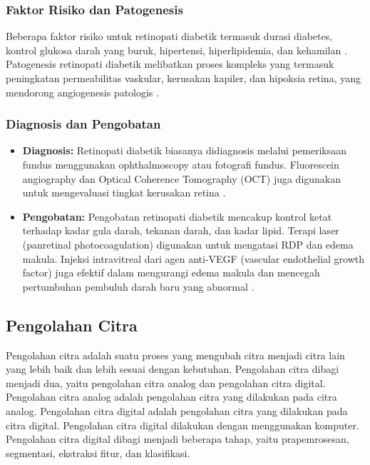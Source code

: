 \subsubsection{Faktor Risiko dan Patogenesis}

Beberapa faktor risiko untuk retinopati diabetik termasuk durasi diabetes, kontrol glukosa darah yang buruk, hipertensi, hiperlipidemia, dan kehamilan \parencite{fong2004diabetic}. Patogenesis retinopati diabetik melibatkan proses kompleks yang termasuk peningkatan permeabilitas vaskular, kerusakan kapiler, dan hipoksia retina, yang mendorong angiogenesis patologis \parencite{antonetti2012diabetic}.

\subsubsection{Diagnosis dan Pengobatan}

\begin{itemize}
    \item \textbf{Diagnosis:} Retinopati diabetik biasanya didiagnosis melalui pemeriksaan fundus menggunakan ophthalmoscopy atau fotografi fundus. Fluorescein angiography dan Optical Coherence Tomography (OCT) juga digunakan untuk mengevaluasi tingkat kerusakan retina \parencite{browning2008optical}.
    \item \textbf{Pengobatan:} Pengobatan retinopati diabetik mencakup kontrol ketat terhadap kadar gula darah, tekanan darah, dan kadar lipid. Terapi laser (panretinal photocoagulation) digunakan untuk mengatasi RDP dan edema makula. Injeksi intravitreal dari agen anti-VEGF (vascular endothelial growth factor) juga efektif dalam mengurangi edema makula dan mencegah pertumbuhan pembuluh darah baru yang abnormal \parencite{ciulla2003intravitreal}.
\end{itemize}

\subsection{Pengolahan Citra}
\label{sec:221}

Pengolahan citra adalah suatu proses yang mengubah citra menjadi citra lain yang lebih baik dan lebih sesuai dengan kebutuhan. Pengolahan citra dibagi menjadi dua, yaitu pengolahan citra analog dan pengolahan citra digital. Pengolahan citra analog adalah pengolahan citra yang dilakukan pada citra analog. Pengolahan citra digital adalah pengolahan citra yang dilakukan pada citra digital. Pengolahan citra digital dilakukan dengan menggunakan komputer. Pengolahan citra digital dibagi menjadi beberapa tahap, yaitu prapemrosesan, segmentasi, ekstraksi fitur, dan klasifikasi.

